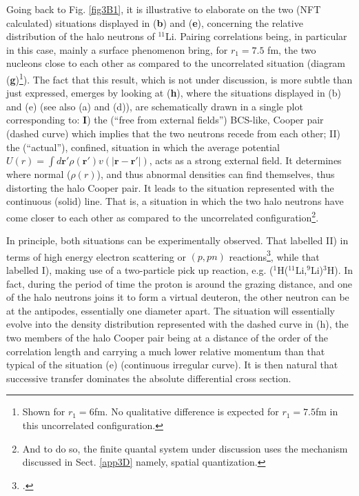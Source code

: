 Going back to Fig. \ref{fig3B1}, it is illustrative to elaborate on the two (NFT calculated) situations displayed in (\textbf{b}) and (\textbf{e}), concerning the relative distribution of the halo neutrons of $^{11}$Li. Pairing correlations being, in particular in this case, mainly a surface phenomenon bring, for $r_1=7.5$ fm, the two nucleons close to each other as compared to the uncorrelated situation (diagram (\textbf{g})\footnote{Shown for $r_1=6$fm. No qualitative difference is expected for $r_1=7.5$fm in this uncorrelated configuration.}). The fact that this result, which is not under discussion, is more subtle than just expressed, emerges by looking at (\textbf{h}), where the situations displayed in (b) and (e) (see also (a) and (d)), are schematically drawn in a single plot corresponding to: \textbf{I}) the (``free from external fields'') BCS-like, Cooper pair  (dashed curve) which implies that the two neutrons recede from each other; II) the (``actual''), confined, situation in which the average potential $U(r)=\int  d\mathbf r' \rho(\mathbf r')v(|\mathbf r-\mathbf r'|)$, acts as a strong external field. It determines where normal ($\rho(r)$), and thus abnormal densities can find themselves, thus distorting the halo Cooper pair. It leads to the situation represented with the continuous (solid) line. That is, a situation in which the two halo neutrons have come closer to each other as compared to the uncorrelated configuration\footnote{And to do so, the finite quantal system under discussion uses the mechanism discussed in Sect. \ref{app3D} namely, spatial quantization.}. 


In principle, both situations can be experimentally observed. That labelled II) in terms of high energy electron scattering or $(p,pn)$ reactions\footnote{\cite{Kubota:20}.}, while that labelled I),  making use of a two-particle pick up reaction, e.g. ($^1$H($^{11}$Li,$^9$Li)$^3$H). In fact, during the period of time the proton is around the grazing distance, and one of the halo neutrons joins it to form a virtual deuteron, the other neutron can be at the antipodes, essentially one diameter apart. The situation will essentially evolve into the density distribution represented with the dashed curve in (h), the two members of the halo Cooper pair being at a distance of the order of the correlation length  and carrying a much lower relative momentum than that typical of the situation (e) (continuous irregular curve). It is then natural that successive transfer dominates the absolute differential cross section.


